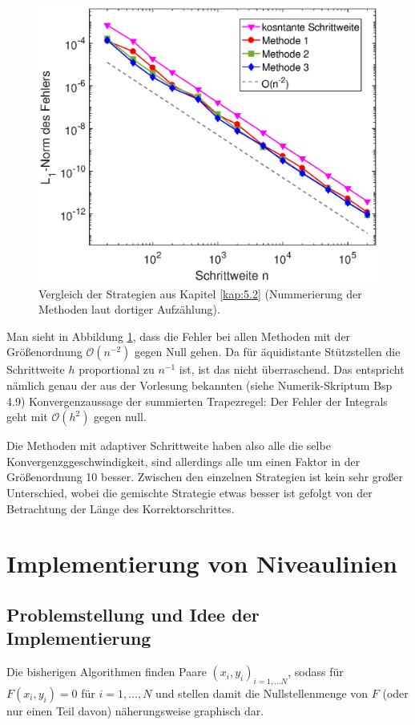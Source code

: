 \documentclass[a4paper,11pt,bibliography=totoc,listof=totoc,headinclude=true,cleardoublepage=empty,oneside]{scrartcl}
\begin{document}
\begin{figure}[ht]
	\centering
	\includegraphics[trim = 0mm 0mm 0mm 0mm, clip, width=0.8\linewidth]{plots/adapt/fehlerplot1}
	\caption{Vergleich der Strategien aus Kapitel \ref{kap:5.2} (Nummerierung der Methoden laut dortiger Aufzählung).}
	\label{fig:fehler1}
\end{figure}

Man sieht in Abbildung \ref{fig:fehler1}, dass die Fehler bei allen Methoden mit der Größenordnung $\mathcal{O}(n^{-2})$ gegen Null gehen. Da für äquidistante Stützstellen die Schrittweite $h$ proportional zu $n^{-1}$ ist, ist das nicht überraschend. Das entspricht nämlich genau der aus der Vorlesung bekannten (siehe Numerik-Skriptum Bsp 4.9) Konvergenzaussage der summierten Trapezregel: Der Fehler der Integrals geht mit $\mathcal{O}(h^2)$ gegen null.

Die Methoden mit adaptiver Schrittweite haben also alle die selbe Konvergenzggeschwindigkeit, sind allerdings alle um einen Faktor in der Größenordnung 10 besser. Zwischen den einzelnen Strategien ist kein sehr großer Unterschied, wobei die gemischte Strategie etwas besser ist gefolgt von der Betrachtung der Länge des Korrektorschrittes. 


\section{Implementierung von Niveaulinien}
\subsection{Problemstellung und Idee der Implementierung}

Die bisherigen Algorithmen finden Paare $(x_i,y_i)_{i=1,\dots N}$, sodass für $F(x_i,y_i)=0$ für $i=1,\dots, N$ und stellen damit die Nullstellenmenge von $F$ (oder nur einen Teil davon) näherungsweise graphisch dar. 
\end{document}

